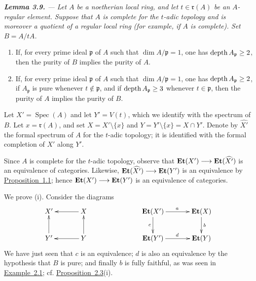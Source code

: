 \medskip
{\itshape
{}\noindent\textbf{Lemma 3.9.} --- Let $A$ be a noetherian local ring, and
let $t\in\mathfrak r(A)$ be an $A$-regular element. Suppose that $A$ is
complete for the $t$-adic topology and is moreover a quotient of a regular
local ring (for example, if $A$ is complete). Set $B=A/tA$.
\begin{enumerate}[label=\textup{(\roman*)},leftmargin=2.2em,itemsep=0.6em,topsep=0.5em]
\item If, for every prime ideal $\mathfrak p$ of $A$ such that
$\dim A/\mathfrak p=1$, one has $\operatorname{depth} A_{\mathfrak p}\geq 2$, then
the purity of $B$ implies the purity of $A$.

\item If, for every prime ideal $\mathfrak p$ of $A$ such that
$\dim A/\mathfrak p=1$, one has $\operatorname{depth} A_{\mathfrak p}\geq 2$, if
$A_{\mathfrak p}$ is pure whenever $t\notin\mathfrak p$, and
if
$\operatorname{depth} A_{\mathfrak p}\geq 3$ whenever $t\in\mathfrak p$, then the
purity of $A$ implies the purity of $B$.
\end{enumerate}
}

\medskip
Let $X'=\operatorname{Spec}(A)$ and let $Y'=V(t)$, which we identify with
the spectrum of $B$. Let $x=\mathfrak r(A)$, and set
$X=X'\setminus\{x\}$ and $Y=Y'\setminus\{x\}=X\cap Y'$. Denote by
$\widehat{X'}$ the formal spectrum of $A$ for the $t$-adic topology; it is
identified with the formal completion of $X'$ along $Y'$.

Since $A$ is complete for the $t$-adic topology, observe that
$\mathbf{Et}(X')\longrightarrow\mathbf{Et}(\widehat{X'})$ is an equivalence of categories.
Likewise, $\mathbf{Et}(\widehat{X'})\longrightarrow\mathbf{Et}(Y')$ is an equivalence by
\hyperref[X.1.1]{Proposition~1.1}; hence $\mathbf{Et}(X')\longrightarrow\mathbf{Et}(Y')$ is an equivalence of
categories.

We prove \textup{(i)}. Consider the diagrams
\[
\xymatrix@C=12mm@R=8mm{
  X' & X\ar[l] &&
  \Et(X')\ar[r]^{a}\ar[d]_{c} & \Et(X)\ar[d]^{b}\\
  Y'\ar[u] & Y\ar[l]\ar[u] &&
  \Et(Y')\ar[r]^{d} & \Et(Y)
}
\]
We have just seen that $c$ is an equivalence; $d$ is also an equivalence by
the hypothesis that $B$ is pure; and finally $b$ is fully faithful, as was
seen in \hyperref[X.2.1]{Example~2.1}; cf. \hyperref[X.2.3]{Proposition~2.3}\textup{(i)}.

